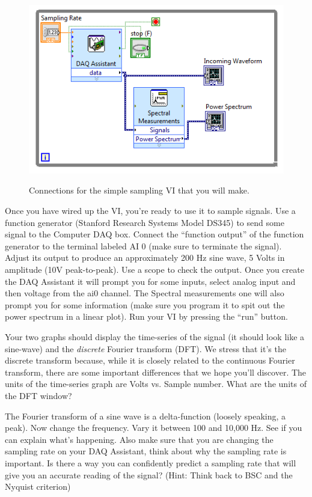 \documentclass{../lab}
\begin{document}
\begin{figure}[h]
    \centering
    \href{http://experimentationlab.berkeley.edu/sites/default/files/NLD/FirstExcersizeBlockDiagram.png}{\includegraphics[width=0.5\linewidth]{images/FirstExcersizeBlockDiagram.png}}
    \caption{Connections for the simple sampling VI that you will make.}
    \label{fig:FirstExcersizeBlockDiagram}
\end{figure}

Once you have wired up the VI, you're ready to use it to sample signals. Use a function generator (Stanford Research Systems Model DS345) to send some signal to the Computer DAQ box. Connect the ``function output'' of the function generator to the terminal labeled AI 0 (make sure to terminate the signal). Adjust its output to produce an approximately 200 Hz sine wave, 5 Volts in amplitude (10V peak-to-peak). Use a scope to check the output. Once you create the DAQ Assistant it will prompt you for some inputs, select analog input and then voltage from the ai0 channel. The Spectral measurements one will also prompt you for some information (make sure you program it to spit out the power spectrum in a linear plot).  Run your VI by pressing the ``run'' button.

Your two graphs should display the time-series of the signal (it should look like a sine-wave) and the \emph{discrete} Fourier transform (DFT). We stress that it's the discrete transform because, while it is closely related to the continuous Fourier transform, there are some important differences that we hope you'll discover. The units of the time-series graph are Volts vs. Sample number. What are the units of the DFT window?

The Fourier transform of a sine wave is a delta-function (loosely speaking, a peak). Now change the frequency. Vary it between 100 and 10,000 Hz. See if you can explain what's happening. Also make sure that you are changing the sampling rate on your DAQ Assistant, think about why the sampling rate is important. Is there a way you can confidently predict a sampling rate that will give you an accurate reading of the signal? (Hint: Think back to BSC and the Nyquist criterion)
\end{document}
